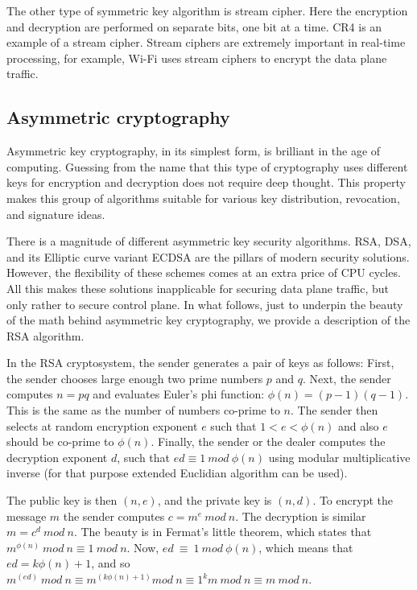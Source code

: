 The other type of symmetric key algorithm is stream cipher. Here the encryption 
and decryption are performed on separate bits, one bit at a time. CR4 is an example 
of a stream cipher. Stream ciphers are extremely important in real-time processing, 
for example, Wi-Fi uses stream ciphers to encrypt the data plane traffic.

\subsection{Asymmetric cryptography}

Asymmetric key cryptography, in its simplest form, is brilliant in the age 
of computing. Guessing from the name that this type of cryptography uses different 
keys for encryption and decryption does not require deep thought. This property makes 
this group of algorithms suitable for various key distribution, revocation, and 
signature ideas. 

There is a magnitude of different asymmetric key security algorithms. 
RSA, DSA, and its Elliptic curve variant ECDSA are the pillars of modern 
security solutions. However, the flexibility of these schemes comes at an extra 
price of CPU cycles. All this makes these solutions inapplicable for securing 
data plane traffic, but only rather to secure control plane. In what follows, 
just to underpin the beauty of the math behind asymmetric key cryptography, 
we provide a description of the RSA algorithm.

In the RSA cryptosystem, the sender generates a pair of keys as follows: 
First, the sender chooses large enough two prime numbers $p$ and $q$. Next, 
the sender computes $n=pq$ and evaluates Euler’s phi function: $\phi(n)=(p-1)(q-1)$. 
This is the same as the number of numbers co-prime to $n$. The sender then selects at 
random encryption exponent $e$ such that $1<e<\phi(n)$ and also $e$ should be co-prime to $\phi(n)$.
Finally, the sender or the dealer computes the decryption exponent $d$, such that 
$ed \equiv 1\ mod\ \phi(n)$ using modular multiplicative inverse (for that purpose extended Euclidian 
algorithm can be used).

The public key is then $(n, e)$, and the private key is $(n, d)$. To encrypt the message $m$ 
the sender computes $c= m^e\ mod\ n$. The decryption is similar $m = c^d\ mod\ n$. The beauty is 
in Fermat’s little theorem, which states that $m^{\phi(n)}\ mod\ n \equiv 1\ mod\ n$. 
Now, $ed\ \equiv\ 1\ mod\ \phi(n)$, which means that 
$ed=k\phi(n)+1$, and so $m^{(ed)}\ mod\ n \equiv m^{(k\phi(n)+1)} mod\ n \equiv 1^k m\ mod\ n \equiv m\ mod\ n$. 

